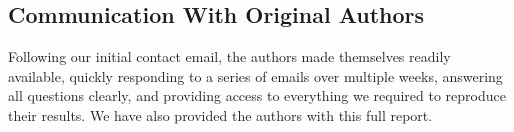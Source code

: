 \subsection{Communication With Original Authors}

Following our initial contact email, the authors made themselves readily available, quickly responding to a series of emails over multiple weeks, answering all questions clearly, and providing access to everything we required to reproduce their results. We have also provided the authors with this full report.

\newpage